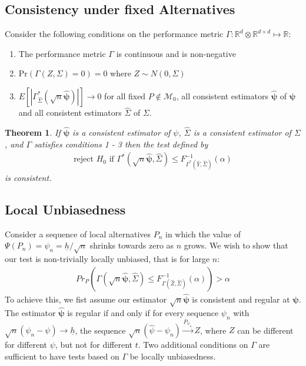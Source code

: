 \documentclass{article}
\newtheorem{theorem}{Theorem}
\newcommand{\pr}{\text{Pr}}
\newcommand{\vmat}{\Sigma}
\newcommand{\disto}{P}
\newcommand{\rvt}{Y}
\newcommand{\rvv}{Z}
\newcommand{\gamestz}{\Gamma(\hat{\rvv}, \hat{\Sigma})}
\newcommand{\gamestp}{\Gamma(\sqrt{n}\hat{\boldsymbol{\psi}}, \hat{\Sigma})}
\newcommand{\rnp}{\sqrt{n} \hat{\boldsymbol{\psi}}}
\newcounter{conditions}
\begin{document}
\subsection{Consistency under fixed Alternatives}

\label{sec:test_cnsty}

Consider the following conditions on the performance metric $\Gamma : \mathbb{R}^d \otimes \mathbb{R}^{d \times d} \mapsto \mathbb{R}$:

\begin{enumerate}
	\item The performance metric $\Gamma$ is continuous and is non-negative
	\item $\pr\left(\Gamma(Z, \Sigma) = 0\right) = 0$ where $Z \sim N(0, \Sigma)$
	\item $E\left[\left|\Gamma^*_{\hat{\Sigma}}(\sqrt{n}\hat{\boldsymbol{\psi}})\right| \right] \rightarrow 0$ for all fixed $P \not \in \mathcal{M}_0$, all consistent estimators $\hat{\boldsymbol{\psi}}$ of $\boldsymbol{\psi}$ and all consistent estimators $\hat{\Sigma}$ of $\Sigma$.
	\setcounter{conditions}{\value{enumi}}
\end{enumerate} 

\begin{theorem}
\label{thm:cnst}
If $\hat{\boldsymbol{\psi}}$ is a consistent estimator of $\psi$, $\hat{\Sigma}$ is a consistent estimator of $\Sigma$, and $\Gamma$ satisfies conditions 1 - 3 then the test defined by
\begin{align*}
	\text{reject } H_0 \text{ if } \Gamma^*(\sqrt{n}\hat{\boldsymbol{\psi}}, \hat{\vmat}) \leq F^{-1}_{\Gamma^*(\hat{\rvt}, \hat{\vmat})}(\alpha)
\end{align*}
is consistent.  
\end{theorem}

\subsection*{Local Unbiasedness}
Consider a sequence of local alternatives $P_n$ in which the value of $\Psi(P_n) = \psi_n = \underline{h}/\sqrt{n}$ shrinks towards zero as $n$ grows.  We wish to show that our test is non-trivially locally unbiased, that is for large $n$:
\begin{align*}
	Pr_{\disto}\left(\gamestp \leq F^{-1}_{\gamestz}(\alpha)\right) > \alpha 
\end{align*}
To achieve this, we fist assume our estimator $\rnp$ is consistent and regular at $\boldsymbol{\psi}$. The estimator $\hat{\boldsymbol{\psi}}$ is regular if and only if for every sequence $\psi_n$ with $\sqrt{n} (\psi_n - \psi) \to \underline{h}$, the sequence $\sqrt{n}(\hat{\psi} - \psi_n) \xrightarrow{P_{\psi_n}} Z$, where $Z$ can be different for different $\psi$, but not for different $t$. Two additional conditions on $\Gamma$ are sufficient to have tests based on $\Gamma$ be locally unbiasedness.
\end{document}
